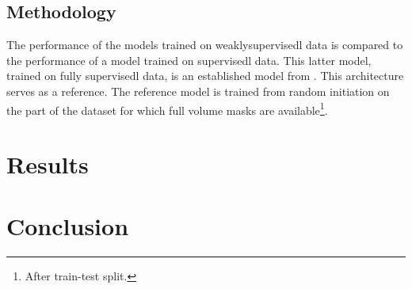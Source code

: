 \begin{multicols}{2}
\subsection*{Methodology}
The performance of the models trained on \Gls{weaklysupervisedl} data is compared to the performance of a model trained on \Gls{supervisedl} data.
This latter model, trained on fully \Gls{supervisedl} data, is an established model from . 
This architecture serves as a reference.
The reference model is trained from random initiation on the part of the dataset for which full volume masks are available\footnote{After train-test split.}.  

\section*{Results}

\section*{Conclusion}
\end{multicols}